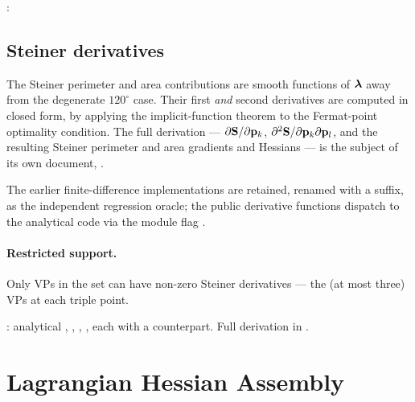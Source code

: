 \documentclass[11pt,a4paper]{article}
\begin{document}
\begin{tcolorbox}[colback=blue!4!white, colframe=blue!40!black,
                  title={Code: Steiner area values}, fontupper=\small]
: 
\end{tcolorbox}

\subsection{Steiner derivatives}
\label{sec:steiner-fd}

The Steiner perimeter and area contributions are smooth functions of $\boldsymbol{\lambda}$
away from the degenerate $120^\circ$ case.  Their first \emph{and} second
derivatives are computed in closed form, by applying the implicit-function
theorem to the Fermat-point optimality condition.  The full derivation ---
$\partial\mathbf{S}/\partial\mathbf{p}_{k}$, $\partial^2\mathbf{S}/\partial\mathbf{p}_{k}\partial\mathbf{p}_{l}$,
and the resulting Steiner perimeter and area gradients and Hessians --- is the
subject of its own document,
.

The earlier finite-difference implementations are retained, renamed with a
 suffix, as the independent regression oracle; the
public  derivative functions dispatch to the
analytical code via the module flag .

\paragraph{Restricted support.}
Only VPs in the set  can have non-zero Steiner
derivatives --- the (at most three) VPs at each triple point.

\begin{tcolorbox}[colback=blue!4!white, colframe=blue!40!black,
                  title={Code: Steiner derivatives}, fontupper=\small]
: analytical
, ,
, ,
each with a  counterpart.  Full derivation in
.
\end{tcolorbox}

\section{Lagrangian Hessian Assembly}
\label{sec:assembly}
\end{document}
